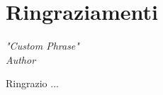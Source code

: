 
\chapter*{Ringraziamenti}

	\begin{flushright}
		\textit{"Custom Phrase"\\Author}\\
	\end{flushright}
	
	\vspace{\baselineskip}
	
	\noindent
	Ringrazio ...
